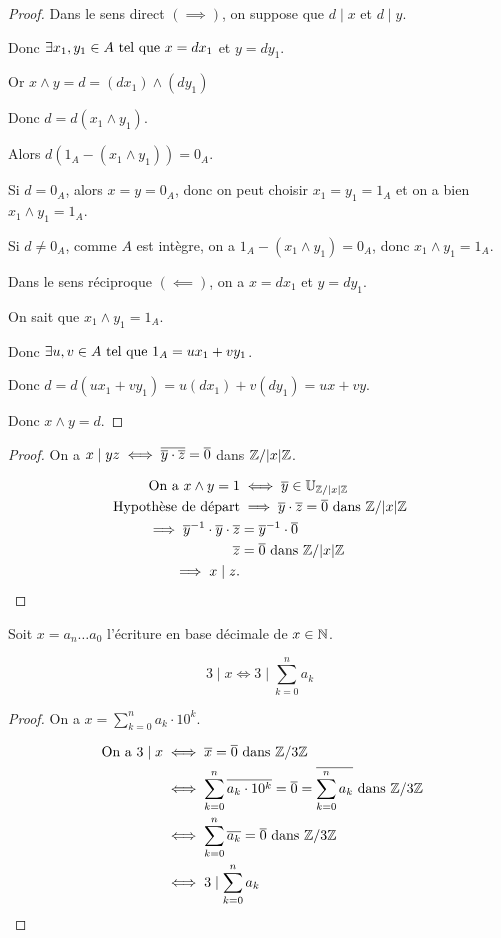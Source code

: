 \documentclass[12pt,a4paper]{report}
\begin{document}
\begin{proof}
    Dans le sens direct $(\implies)$, on suppose que $d\mid x$ et $d\mid y$.

    Donc $\exists x_1,y_1 \in A \text{ tel que } x=dx_1$ et $y=dy_1$.

    Or $x\wedge y = d = (dx_1) \wedge (dy_1)$

    Donc $d = d(x_1 \wedge y_1)$.

    Alors $d(1_A - (x_1 \wedge y_1)) = 0_A$.

    Si $d = 0_A$, alors $x=y=0_A$, donc on peut choisir $x_1=y_1=1_A$ et on a bien $x_1 \wedge y_1 = 1_A$.

    Si $d \neq 0_A$, comme $A$ est intègre, on a $1_A - (x_1 \wedge y_1) = 0_A$, donc $x_1 \wedge y_1 = 1_A$.

    Dans le sens réciproque $(\impliedby)$, on a $x=dx_1$ et $y=dy_1$.

    On sait que $x_1 \wedge y_1 = 1_A$.

    Donc $\exists u,v \in A \text{ tel que } 1_A = u x_1 + v y_1$.

    Donc $d = d(u x_1 + v y_1) = u (dx_1) + v (dy_1) = ux + vy$.

    Donc $x \wedge y = d$.
\end{proof}

\begin{proof}
    On a $x\mid yz \iff \overline{\overline{y} \cdot \overline{z}} = \overline{0}$ dans $\mathbb{Z}/|x|\mathbb{Z}$.

    \begin{align*}
        \text{ On a } x\wedge y = 1 &\iff \overline{y} \in \mathbb{U}_{\mathbb{Z}/|x|\mathbb{Z}}\\
        \text{Hypothèse de départ} &\implies \overline{y} \cdot \overline{z} = \overline{0} \text{ dans } \mathbb{Z}/|x|\mathbb{Z}\\
        \implies \overline{y}^{-1} \cdot \overline{y} \cdot \overline{z} &= \overline{y}^{-1} \cdot \overline{0}\\
        \overline{z} &= \overline{0} \text{ dans } \mathbb{Z}/|x|\mathbb{Z}\\
        \implies x \mid z.
    \end{align*}
\end{proof}

\begin{property}
    Soit $x=a_n\dots a_0$ l'écriture en base décimale de $x \in \mathbb{N}$.

    $$3 \mid x \iff 3 \mid \sum_{k=0}^{n}a_k$$
\end{property}

\begin{proof}
    On a $x=\sum_{k=0}^{n}a_k\cdot 10^k$.

    \begin{align*}
        \text{ On a } 3\mid x &\iff \overline{x} = \overline{0} \text{ dans } \mathbb{Z}/3\mathbb{Z}\\
        &\iff \sum_{k=0}^{n}\overline{a_k \cdot 10^k} = \overline{0} = \overline{\sum_{k=0}^{n}a_k} \text{ dans } \mathbb{Z}/3\mathbb{Z}\\
        &\iff \sum_{k=0}^{n}\overline{a_k} = \overline{0} \text{ dans } \mathbb{Z}/3\mathbb{Z}\\
        &\iff 3 \mid \sum_{k=0}^{n}a_k
    \end{align*}
\end{proof}
\end{document}
